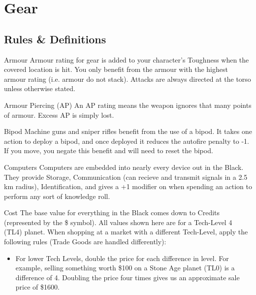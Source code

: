 
\section{Gear}
\label{sec:gear}

\begin{multicols}{2}

\subsection{Rules \& Definitions}
\label{sec:gear-rules}

\begin{genericsection}{Armour}
Armour rating for gear is added to your character's Toughness when the covered location is hit. You only benefit from the armour with the highest armour rating (i.e. armour do not stack). Attacks are always directed at the torso unless otherwise stated.
\end{genericsection}

\begin{genericsection}{Armour Piercing (AP)}
An AP rating means the weapon ignores that many points of armour. Excess AP is simply lost.
\end{genericsection}

\begin{genericsection}{Bipod}
Machine guns and sniper rifles benefit from the use of a bipod. It takes one action to deploy a bipod, and once deployed it reduces the autofire penalty to -1. If you move, you negate this benefit and will need to reset the bipod.
\end{genericsection}

\begin{genericsection}{Computers}
Computers are embedded into nearly every device out in the Black. They provide Storage, Communication (can recieve and transmit signals in a 2.5 km radius), Identification, and gives a +1 modifier on when spending an action to perform any sort of knowledge roll.
\end{genericsection}

\begin{genericsection}{Cost}
The base value for everything in the Black comes down to Credits (represented by the \$ symbol). All values shown here are for a Tech-Level 4 (TL4) planet. When shopping at a market with a different Tech-Level, apply the following rules (Trade Goods are handled differently):
\begin{itemize}
  \item For lower Tech Levels, double the price for each difference in level. For example, selling something worth \$100 on a Stone Age planet (TL0) is a difference of 4. Doubling the price four times gives us an approximate sale price of \$1600.


\end{itemize}
\end{genericsection}
\end{multicols}
